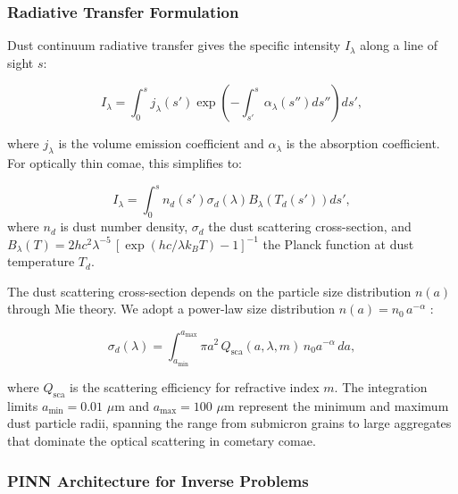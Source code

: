 \documentclass[preprint2]{aastex631}
\begin{document}
\subsubsection{Radiative Transfer Formulation}

Dust continuum radiative transfer gives the specific intensity $I_\lambda$ along a line of sight $s$:

\begin{equation}\label{eq:rt_dust}
I_\lambda = \int_{0}^{s} j_\lambda(s') \exp\left(-\int_{s'}^{s} \alpha_\lambda(s'') ds''\right) ds',
\end{equation}

where $j_\lambda$ is the volume emission coefficient and $\alpha_\lambda$ is the absorption coefficient. For optically thin comae, this simplifies to:

\begin{equation}\label{eq:thin_dust}
I_\lambda = \int_{0}^{s} n_d(s') \sigma_d(\lambda) B_\lambda(T_d(s')) ds',
\end{equation}
where $n_d$ is dust number density, $\sigma_d$ the dust scattering cross-section, and $B_\lambda(T) = 2hc^2\lambda^{-5}\,[\exp(hc/\lambda k_B T) - 1]^{-1}$ the Planck function at dust temperature $T_d$.

The dust scattering cross-section depends on the particle size distribution $n(a)$ through Mie theory. We adopt a power-law size distribution $n(a) = n_0\, a^{-\alpha}$ \citep{kolokolova04}:

\begin{equation}\label{eq:mie_sigma}
\sigma_d(\lambda) = \int_{a_{\min}}^{a_{\max}} \pi a^2 \, Q_{\text{sca}}(a, \lambda, m) \, n_0 a^{-\alpha} \, da,
\end{equation}

where $Q_{\text{sca}}$ is the scattering efficiency for refractive index $m$. The integration limits $a_{\min} = 0.01$ $\mu$m and $a_{\max} = 100$ $\mu$m represent the minimum and maximum dust particle radii, spanning the range from submicron grains to large aggregates that dominate the optical scattering in cometary comae.

\subsubsection{PINN Architecture for Inverse Problems}
\end{document}
